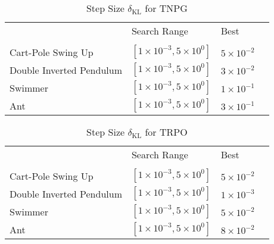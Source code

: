 \documentclass{article}
\begin{document}
\begin{table}[!h]
\centering
\caption{Step Size $\delta_{\text{KL}}$ for TNPG}
\label{hyper_npg}
\begin{tabular}{l|lll}
\cline{1-4} \\ [-8pt]
 & Search Range              & Best                 &  \\ [2pt] \cline{1-4} \\ [-8pt]
Cart-Pole Swing Up     & $[1\times 10^{-3}, 5 \times 10^{0}]$            & $5 \times 10^{-2}$               &  \\
Double Inverted Pendulum     & $[1\times 10^{-3}, 5 \times 10^0]$     & $3 \times 10^{-2}$               &  \\
Swimmer               & $[1\times 10^{-3}, 5 \times 10^{0}]$            & $1\times 10^{-1}$               &  \\
Ant                   & $[1\times 10^{-3}, 5 \times 10^{0}]$            & $3 \times 10^{-1}$               &  \\ [2pt] \cline{1-4}
\end{tabular}
\end{table}

\begin{table}[!h]
\centering
\caption{Step Size $\delta_{\text{KL}}$ for TRPO}
\label{hyper_trpo}
\begin{tabular}{l|lll}
\cline{1-4} \\ [-8pt]
 & Search Range              & Best                 &  \\ [2pt] \cline{1-4} \\ [-8pt]
Cart-Pole Swing Up     & $[1\times 10^{-3}, 5 \times 10^{0}]$            & $5 \times 10^{-2}$               &  \\
Double Inverted Pendulum     & $[1\times 10^{-3}, 5 \times 10^{0}]$     & $1 \times 10^{-3}$               &  \\
Swimmer               & $[1\times 10^{-3}, 5 \times 10^{0}]$            & $5 \times 10^{-2}$               &  \\
Ant                   & $[1\times 10^{-3}, 5 \times 10^{0}]$            & $8 \times 10^{-2}$               &  \\ [2pt] \cline{1-4}
\end{tabular}
\end{table}
\end{document}
